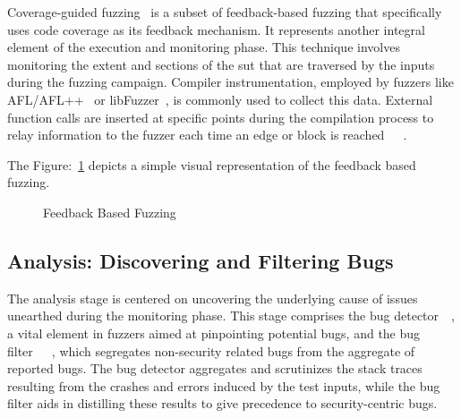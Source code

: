 Coverage-guided fuzzing~\cite{jaaskela2016genetic} is a subset of feedback-based
fuzzing that specifically uses code coverage as its feedback mechanism. It represents another integral element of
the execution and monitoring phase. This technique involves monitoring the extent and
sections of the \acrshort{sut} that are traversed by the inputs during the
fuzzing campaign. Compiler instrumentation, employed by fuzzers like
AFL/AFL++~\cite{257204} or libFuzzer~\cite{libFuzze17:online}, is commonly
used to collect this data. External function calls are inserted at
specific points during the compilation process to relay information to the fuzzer each
time an edge or block is reached~\cite{libFuzze17:online}~\cite{bohme2016coverage}~\cite{257204}.


The Figure:~\ref{fig:feedback-based-fuzzing} depicts a simple visual representation of the
feedback based fuzzing.


\begin{figure}[h]
        \centering
        \caption{Feedback Based Fuzzing~\cite{TheMagic36:online}\cite{LucianoR49:online}}\label{fig:feedback-based-fuzzing}
\end{figure}

\subsection{Analysis: Discovering and Filtering Bugs}
The analysis stage is centered on uncovering the underlying cause of issues
unearthed during the monitoring phase. This stage comprises the bug
detector~\cite{liang2018fuzzing}~\cite{bekrar2012taint}, a vital element in fuzzers
aimed at pinpointing potential bugs,
and the bug filter~\cite{peng2018t}~\cite{bekrar2012taint}~\cite{chen2013taming},
which segregates non-security related bugs
from the aggregate of reported bugs. The bug detector aggregates and scrutinizes the
stack traces resulting from the crashes and errors induced by the test
inputs, while the bug filter aids in distilling these results to give precedence
to security-centric bugs.


